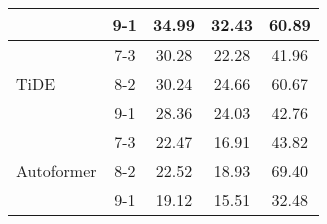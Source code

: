 \begin{table}[h!]
\begin{tabular}{|l|c|c|c|c|}
    \rowcolor{white}  & 9-1 & 34.99 & 32.43 & 60.89 \\ \hline
    \rowcolor{white!30} & 7-3 & 30.28 & 22.28 & 41.96 \\ 
    \rowcolor{white!30} TiDE & 8-2 & 30.24 & 24.66 & 60.67 \\ 
    \rowcolor{white!30} & 9-1 & 28.36 & 24.03 & 42.76 \\ \hline
    \rowcolor{white}  & 7-3 & 22.47 & 16.91 & 43.82 \\ 
    \rowcolor{white} Autoformer & 8-2 & 22.52 & 18.93 & 69.40 \\ 
    \rowcolor{white}  & 9-1 & 19.12 & 15.51 & 32.48 \\ \hline

    \end{tabular}
\end{table}